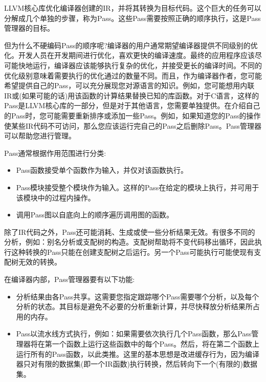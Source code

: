 LLVM核心库优化编译器创建的IR，并将其转换为目标代码。这个巨大的任务可以分解成几个单独的步骤，称为Pass。这些Pass需要按照正确的顺序执行，这是Pass管理器的目标。\par

但为什么不硬编码Pass的顺序呢?编译器的用户通常期望编译器提供不同级别的优化。开发人员在开发期间进行优化，喜欢更快的编译速度。最终的应用程序应该尽可能快地运行，编译器应该能够执行复杂的优化，并接受更长的编译时间。不同的优化级别意味着需要执行的优化通过的数量不同。而且，作为编译器作者，您可能希望提供自己的Pass，可以充分展现您对源语言的知识。例如，您可能想用内联IR或(如果可能的话)用该函数的计算结果替换已知的库函数。对于C语言，这样的Pass是LLVM核心库的一部分，但是对于其他语言，您需要单独提供。在介绍自己的Pass时，您可能需要重新排序或添加一些Pass。例如，如果知道您的Pass的操作使某些IR代码不可访问，那么您应该运行完自己的Pass之后删除Pass。Pass管理器可以帮助您进行管理。\par

Pass通常根据作用范围进行分类:\par

\begin{itemize}
\item Pass函数接受单个函数作为输入，并仅对该函数执行。
\item Pass模块接受整个模块作为输入。这样的Pass在给定的模块上执行，并可用于该模块中的过程内操作。
\item 调用Pass图以自底向上的顺序遍历调用图的函数。
\end{itemize}

除了IR代码之外，Pass还可能消耗、生成或使一些分析结果无效。有很多不同的分析，例如：别名分析或支配树的构造。支配树帮助将不变代码移出循环，因此执行这种转换的Pass只能在创建支配树之后运行。另一个Pass可能执行可能使现有支配树无效的转换。\par

在编译器内部，Pass管理器要有以下功能:\par

\begin{itemize}
\item 分析结果由各Pass共享。这需要您指定跟踪哪个Pass需要哪个分析，以及每个分析的状态。其目标是避免不必要的分析重新计算，并尽快释放分析结果所占用的内存。
\item Pass以流水线方式执行，例如：如果需要依次执行几个Pass函数，那么Pass管理器将在第一个函数上运行这些函数中的每个Pass。然后，将在第二个函数上运行所有的Pass函数，以此类推。这里的基本思想是改进缓存行为，因为编译器只对有限的数据集(即一个IR函数)执行转换，然后转向下一个(有限的)数据集。
\end{itemize}

